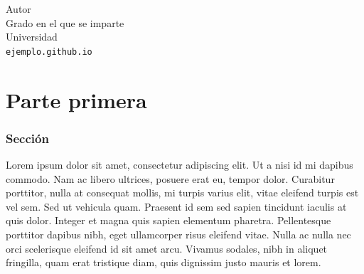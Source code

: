 \documentclass[10pt, a4paper]{article}
\theoremstyle{theorem-style}
\theoremstyle{definition-style}
\theoremstyle{remark-style}
\theoremstyle{example-style}
\theoremstyle{definition-style}
\theoremstyle{remark-style}
\begin{document}

\begin{titlepage}

	\parbox[t]{\textwidth}{
			\raggedright %
			\fontsize{50pt}{50pt}\selectfont\sffamily{}
	}

	\vfill

	\parbox[t]{\textwidth}{
		\raggedright %
		\sffamily\large
		{\Large Autor}\\[4pt]
		Grado en el que se imparte\\
		Universidad\\[4pt]
		\texttt{ejemplo.github.io}
	}

\end{titlepage}


\thispagestyle{empty}
\tableofcontents
\newpage


\part{Parte primera}

\section{Sección}

Lorem ipsum dolor sit amet, consectetur adipiscing elit. Ut a nisi id mi dapibus commodo. Nam ac libero ultrices, posuere erat eu, tempor dolor. Curabitur porttitor, nulla at consequat mollis, mi turpis varius elit, vitae eleifend turpis est vel sem. Sed ut vehicula quam. Praesent id sem sed sapien tincidunt iaculis at quis dolor. Integer et magna quis sapien elementum pharetra. Pellentesque porttitor dapibus nibh, eget ullamcorper risus eleifend vitae. Nulla ac nulla nec orci scelerisque eleifend id sit amet arcu. Vivamus sodales, nibh in aliquet fringilla, quam erat tristique diam, quis dignissim justo mauris et lorem.
\end{document}

